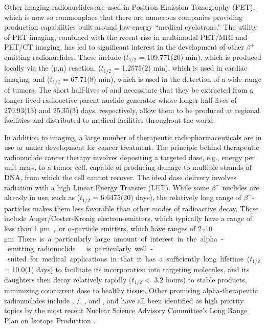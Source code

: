 \documentclass[letterpaper]{ar-1col}
\newcommand{\mmicro}{\si\micro}
\begin{document}
Other imaging radionuclides are used in Positron Emission Tomography (PET), which is now so commonplace that
there are numerous companies   providing production capabilities built around low-energy \enquote{medical cyclotrons.} 
The utility of PET imaging, combined with the recent rise in multimodal PET/MRI and PET/CT imaging,  has
led to significant interest in the development of other $\beta^+$ emitting radionuclides.
These include  ($t_{1/2}$ = 109.771(20) min), which is produced locally via the (p,n) reaction,  ($t_{1/2}$ = 1.2575(2) min), which is used in cardiac imaging, and   ($t_{1/2}$ = 67.71(8) min), which is used in the detection of a wide range of tumors.
 The short half-lives of  and  necessitate that they be extracted from a longer-lived radioactive parent nuclide generator whose longer half-lives of 270.93(13) and 25.35(3) days, respectively, allow them to be produced at regional facilities and distributed to medical facilities throughout the world.
 

In addition to imaging, a large number of therapeutic radiopharmaceuticals are in use or under development for cancer treatment.
 The principle behind therapeutic radionuclide cancer therapy involves depositing a targeted dose, e.g., energy per unit mass, to a tumor cell,  capable of producing damage to multiple strands of DNA, from which the cell cannot recover.
 The ideal dose delivery involves radiation with a high Linear Energy Transfer (LET).
 While some $\beta^-$ nuclides are already in use, such as  ($t_{1/2}$ = 6.6475(20) days), the relatively long range of $\beta^-$-particles makes them less favorable than other modes of radioactive decay.
 These include Auger/Coster-Kronig electron-emitters, which typically have a range of less than 1 \mmicro m, or $\alpha$-particle emitters, which have ranges of 2--10 \mmicro m.
 

There is a particularly large amount of interest in the alpha-emitting radionuclide .
  is particularly well-suited for medical applications in that it has a sufficiently long lifetime ($t_{1/2}$ = 10.0(1) days) to facilitate its incorporation into targeting molecules, and its daughters then decay relatively rapidly ($t_{1/2}<$ 3.2 hours) to stable products, minimizing concurrent dose to healthy tissue.
Other promising alpha-therapeutic radionuclides include , /, ,  and , and have all been identified as high priority topics by the most recent Nuclear Science Advisory Committee's Long Range Plan on Isotope Production \cite{NSACIsotopesSubcommittee2015}.
\end{document}
